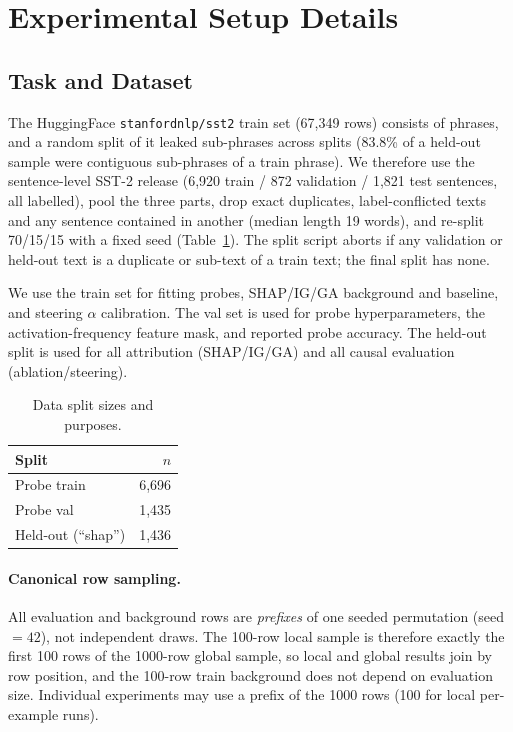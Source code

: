 \clearpage
\appendix

\section{Experimental Setup Details}
\label{app:setup}

\subsection{Task and Dataset}
\label{app:dataset}
The HuggingFace \texttt{stanfordnlp/sst2} train set (67,349 rows) consists of phrases, and a random split of it leaked sub-phrases across splits (83.8\% of a held-out sample were contiguous sub-phrases of a train phrase). We therefore use the sentence-level SST-2 release (6,920 train / 872 validation / 1,821 test sentences, all labelled), pool the three parts, drop exact duplicates, label-conflicted texts and any sentence contained in another (median length 19 words), and re-split 70/15/15 with a fixed seed (Table~\ref{tab:app-splits}). The split script aborts if any validation or held-out text is a duplicate or sub-text of a train text; the final split has none.

We use the train set for fitting probes, SHAP/IG/GA background and baseline, and steering $\alpha$ calibration. The val set is used for probe hyperparameters, the activation-frequency feature mask, and reported probe accuracy. The held-out split is used for all attribution (SHAP/IG/GA) and all causal evaluation (ablation/steering).

\begin{table}[h]
\centering
\caption{Data split sizes and purposes.}
\label{tab:app-splits}
\begin{tabular}{l r}
\toprule
Split & $n$ \\
\midrule
Probe train & 6{,}696 \\
Probe val & 1{,}435 \\
Held-out (``shap'') & 1{,}436 \\
\bottomrule
\end{tabular}
\end{table}

\paragraph{Canonical row sampling.} All evaluation and background rows are
\emph{prefixes} of one seeded permutation (seed$=42$), not independent
draws. The 100-row local sample is therefore exactly the first 100 rows of
the 1000-row global sample, so local and global results join by row
position, and the 100-row train background does not depend on evaluation
size. Individual experiments may use a prefix of the 1000 rows (100 for
local per-example runs).

